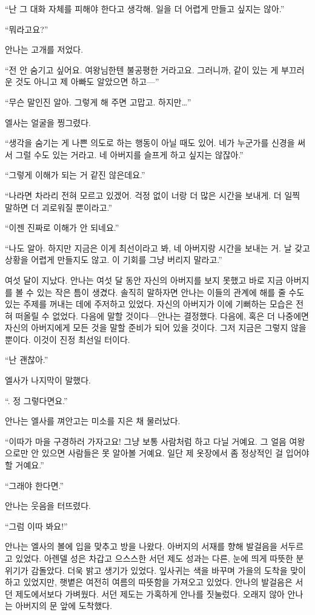 ``난 그 대화 자체를 피해야 한다고 생각해. 일을 더 어렵게 만들고 싶지는 않아.''

``뭐라고요?''

안나는 고개를 저었다.

``전 안 숨기고 싶어요. 여왕님한텐 불공평한 거라고요. 그러니까, 같이 있는 게 부끄러운 것도 아니고 제 아빠도 알았으면 하고—''

``무슨 말인진 알아. 그렇게 해 주면 고맙고. 하지만\ldots''

엘사는 얼굴을 찡그렸다.

``생각을 숨기는 게 나쁜 의도로 하는 행동이 아닐 때도 있어. 네가 누군가를 신경을 써서 그럴 수도 있는 거라고. 네 아버지를 슬프게 하고 싶지는 않잖아.''

``그렇게 이해가 되는 거 같진 않은데요.''

``나라면 차라리 전혀 모르고 있겠어. 걱정 없이 너랑 더 많은 시간을 보내게. 더 일찍 말하면 더 괴로워질 뿐이라고.''

``이젠 진짜로 이해가 안 되네요.''

``나도 알아. 하지만 지금은 이게 최선이라고 봐, 네 아버지랑 시간을 보내는 거. 날 갖고 상황을 어렵게 만들지도 않고. 이 기회를 그냥 버리지 말라고.''

여섯 달이 지났다. 안나는 여섯 달 동안 자신의 아버지를 보지 못했고 바로 지금 아버지를 볼 수 있는 작은 틈이 생겼다. 솔직히 말하자면 안나는 이들의 관계에 해를 줄 수도 있는 주제를 꺼내는 데에 주저하고 있었다. 자신의 아버지가 이에 기뻐하는 모습은 전혀 떠올릴 수 없었다. 다음에 말할 것이다—안나는 결정했다. 다음에, 혹은 더 나중에면 자신의 아버지에게 모든 것을 말할 준비가 되어 있을 것이다. 그저 지금은 그렇지 않을 뿐이다. 이것이 진정 최선일 터이다.

``난 괜찮아.''

엘사가 나지막이 말했다.

``. 정 그렇다면요.''

안나는 엘사를 껴안고는 미소를 지은 채 물러났다.

``이따가 마을 구경하러 가자고요! 그냥 보통 사람처럼 하고 다닐 거예요. 그 얼음 여왕으로만 안 있으면 사람들은 못 알아볼 거예요. 일단 제 옷장에서 좀 정상적인 걸 입어야 할 거예요.''

``그래야 한다면.''

안나는 웃음을 터뜨렸다.

``그럼 이따 봐요!''

안나는 엘사의 볼에 입을 맞추고 방을 나왔다. 아버지의 서재를 향해 발걸음을 서두르고 있었다. 아렌델 성은 차갑고 으스스한 서던 제도 성과는 다른, 눈에 띄게 따뜻한 분위기가 감돌았다. 더욱 밝고 생기가 있었다. 잎사귀는 색을 바꾸며 가을의 도착을 맞이하고 있었지만, 햇볕은 여전히 여름의 따뜻함을 가져오고 있었다. 안나의 발걸음은 서던 제도에서보다 가벼웠다. 서던 제도는 가혹하게 안나를 짓눌렀다. 오래지 않아 안나는 아버지의 문 앞에 도착했다.

